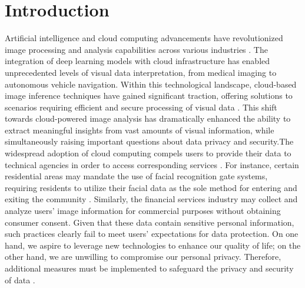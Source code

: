 \documentclass[conference]{IEEEtran}
\begin{document}
\section{Introduction}
Artificial intelligence and cloud computing advancements have revolutionized image processing and analysis capabilities across various industries \cite{makridakis2017forthcoming} \cite{zhang2010cloud}. The integration of deep learning models with cloud infrastructure has enabled unprecedented levels of visual data interpretation, from medical imaging to autonomous vehicle navigation. Within this technological landscape, cloud-based image inference techniques have gained significant traction, offering solutions to scenarios requiring efficient and secure processing of visual data \cite{shokri2017membership}. This shift towards cloud-powered image analysis has dramatically enhanced the ability to extract meaningful insights from vast amounts of visual information, while simultaneously raising important questions about data privacy and security.The widespread adoption of cloud computing compels users to provide their data to technical agencies in order to access corresponding services \cite{wang2018stealing}. For instance, certain residential areas may mandate the use of facial recognition gate systems, requiring residents to utilize their facial data as the sole method for entering and exiting the community \cite{cui2018security}. Similarly, the financial services industry may collect and analyze users' image information for commercial purposes without obtaining consumer consent. Given that these data contain sensitive personal information, such practices clearly fail to meet users' expectations for data protection. On one hand, we aspire to leverage new technologies to enhance our quality of life; on the other hand, we are unwilling to compromise our personal privacy. Therefore, additional measures must be implemented to safeguard the privacy and security of data \cite{van2014datafication}.
\end{document}
